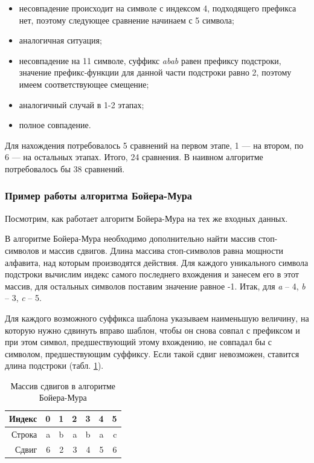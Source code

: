 \documentclass[a4paper,12pt]{article}
\begin{document}
\begin{itemize}
	\item[1)] несовпадение происходит на символе с индексом 4,
	подходящего префикса нет, поэтому следующее сравнение начинаем с 5 символа;
	\item[2)] аналогичная ситуация;
	\item[3)] несовпадение на 11 символе, суффикс \textit{abab}
	равен префиксу подстроки, значение префикс-функции для данной части подстроки
	равно 2, поэтому имеем соответствующее смещение;
	\item[4)] аналогичный случай в 1-2 этапах;
	\item[5)] полное совпадение.
\end{itemize}

Для нахождения потребовалось 5 сравнений на первом этапе, 1 --- на втором,
по 6 --- на остальных этапах. Итого, 24 сравнения. В наивном алгоритме
потребовалось бы 38 сравнений.

\subsubsection{Пример работы алгоритма Бойера-Мура}

Посмотрим, как работает алгоритм Бойера-Мура на тех же входных данных.

В алгоритме Бойера-Мура необходимо дополнительно найти
массив стоп-символов и массив сдвигов.
Длина массива стоп-символов равна мощности алфавита, над которым производятся действия.
Для каждого уникального символа подстроки вычислим индекс самого последнего вхождения
и занесем его в этот массив, для остальных символов поставим значение равное -1.
Итак, для \textit{a} -- 4, \textit{b} -- 3, \textit{c} -- 5.

Для каждого возможного суффикса шаблона указываем наименьшую величину,
на которую нужно сдвинуть вправо шаблон,
чтобы он снова совпал с префиксом и при этом символ,
предшествующий этому вхождению, не совпадал бы с символом, предшествующим суффиксу.
Если такой сдвиг невозможен, ставится длина подстроки (табл. \ref{shift_}).

\begin{table} [h!]
	\begin{center}
		\caption{Массив сдвигов в алгоритме Бойера-Мура}
		\begin{tabular}{|r|rrrrrr|}
			\hline
			Индекс & 0 &          1 &          2 &          3 &          4 &          5 \\
			\hline
			Строка &         a &          b &          a &          b &          a &          c \\
			\hline
			Сдвиг &         6 &          2 &          3 &          4 &          5 &          6 \\
			\hline
		\end{tabular}  
		\label{shift_}
	\end{center}
\end{table}
\end{document}
